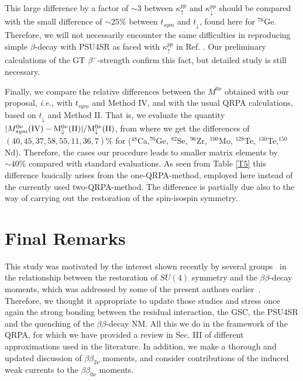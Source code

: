 \documentclass[nofootinbib,twocolumn,eqsecnum,floats,aps]{revtex4}
\def\ie{{\it i.e., }}
\def\b {{\beta}}
\begin{document}
{This large difference by a factor of $\sim 3$ between $\kappa^{pp}_\uparrow$ and $\kappa^{pp}_\downarrow$ should be compared with the small difference of $\sim 25\%$ between $t_{sym}$ and $t_\downarrow$, found here for
 $^{76}$Ge. Therefore, we will not necessarily encounter the same difficulties in reproducing simple $\b$-decay with PSU4SR as faced with  $\kappa^{pp}_\uparrow$ in Ref. \cite{Sim04}.   Our preliminary calculations  of the GT  $\b^-$-strength  confirm this fact, but detailed study is still necessary.

Finally, we compare the relative differences between the $M^{0\nu}$ obtained with our proposal, \ie with $t_{sym}$ and  Method IV,  and with
the   usual QRPA calculations, based on $t_{\downarrow}$ and  Method II. That is, we evaluate the quantity
 $|M^{0\nu}_{sym}(\rm{IV})-M^{0\nu}_\downarrow(II)|/M^{0\nu}_\downarrow(II)$, from where
we get the differences of $(40,        45,        37,         58,  55,11 ,            36,       7)\%$ 
for ($^{48}$Ca,$^{76}$Ge, $^{82}$Se, $^{96}$Zr, $^{100}$Mo, $^{128}$Te, $^{130}$Te,$^{150}$Nd).
Therefore,   the cases our procedure leads to smaller matrix elements
by $\sim 40\%$ compared with standard evaluations.
As seen from Table \ref{T5}  this difference basically arises  from the one-QRPA-method,
employed here  instead  of the currently used two-QRPA-method. The difference is
partially due also  to the way of carrying out the restoration of the spin-isospin
symmetry.


\section{Final Remarks}\label{Sec5}



This study was motivated by the interest shown recently by several
groups~\cite{Sim13,Don15,Ste15,Unl15,Hyv15}
in the relationship between the restoration of  $SU (4)$ symmetry
and the $\b\b$-decay moments,  which was addressed by some of the present authors
earlier~\cite{Krm90,Hir90,Hir90a,Hir90b,Krm92,Krm93,Krm93a,Krm94,Krm94a}.
Therefore, we thought it appropriate to update those studies and stress
once again the  strong bonding between the residual interaction, the GSC,
the PSU4SR %
and the quenching  of the  $\b\b$-decay NM. All this we do
in the framework of the QRPA, for which we have provided a review in
Sec. III of  different approximations used in the literature.
 In addition, we  make a thorough and updated discussion
of $\b\b_{2\nu}$ moments, and
consider  contributions of the induced weak currents
to the   $\b\b_{0\nu}$ moments.

}
\end{document}
